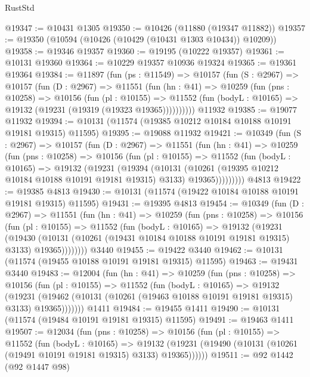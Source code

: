 \begin{lexlean}{RustStd}
\begin{coremodule}
@19347 := @10431 @1305
@19350 := @10426 (@11880 (@19347 @11882))
@19357 := @19350 (@10594 (@10426 (@10429 (@10431 @1303 @10434)) @10209))
@19358 := @19346 @19357
@19360 := @19195 (@10222 @19357)
@19361 := @10131 @19360
@19364 := @10229 @19357 @10936 @19324
@19365 := @19361 @19364
@19384 := @11897
    (fun (ps : @11549) =>
    @10157
      (fun (S : @2967) =>
      @10157
        (fun (D : @2967) =>
        @11551
          (fun (hn : @41) =>
          @10259
            (fun (pns : @10258) =>
            @10156
              (fun (pl : @10155) =>
              @11552 (fun (bodyL : @10165) => @19132 (@19231 (@19319 (@19323 @19365))))))))))
    @11932
@19385 := @19077 @11932
@19394 := @10131 (@11574 (@19385 @10212 @10184 @10188 @10191 @19181 @19315) @11595)
@19395 := @19088 @11932
@19421 := @10349
    (fun (S : @2967) =>
    @10157
      (fun (D : @2967) =>
      @11551
        (fun (hn : @41) =>
        @10259
          (fun (pns : @10258) =>
          @10156
            (fun (pl : @10155) =>
            @11552
              (fun (bodyL : @10165) =>
              @19132
                (@19231
                  (@19394
                    (@10131
                      (@10261 (@19395 @10212 @10184 @10188 @10191 @19181 @19315) @3133)
                      @19365)))))))))
    @4813
@19422 := @19385 @4813
@19430 := @10131 (@11574 (@19422 @10184 @10188 @10191 @19181 @19315) @11595)
@19431 := @19395 @4813
@19454 := @10349
    (fun (D : @2967) =>
    @11551
      (fun (hn : @41) =>
      @10259
        (fun (pns : @10258) =>
        @10156
          (fun (pl : @10155) =>
          @11552
            (fun (bodyL : @10165) =>
            @19132
              (@19231
                (@19430
                  (@10131 (@10261 (@19431 @10184 @10188 @10191 @19181 @19315) @3133) @19365))))))))
    @3440
@19455 := @19422 @3440
@19462 := @10131 (@11574 (@19455 @10188 @10191 @19181 @19315) @11595)
@19463 := @19431 @3440
@19483 := @12004
    (fun (hn : @41) =>
    @10259
      (fun (pns : @10258) =>
      @10156
        (fun (pl : @10155) =>
        @11552
          (fun (bodyL : @10165) =>
          @19132
            (@19231
              (@19462 (@10131 (@10261 (@19463 @10188 @10191 @19181 @19315) @3133) @19365)))))))
    @1411
@19484 := @19455 @1411
@19490 := @10131 (@11574 (@19484 @10191 @19181 @19315) @11595)
@19491 := @19463 @1411
@19507 := @12034
    (fun (pns : @10258) =>
    @10156
      (fun (pl : @10155) =>
      @11552
        (fun (bodyL : @10165) =>
        @19132 (@19231 (@19490 (@10131 (@10261 (@19491 @10191 @19181 @19315) @3133) @19365))))))
@19511 := @92 @1442 (@92 @1447 @98)

\end{coremodule}
\end{lexlean}

